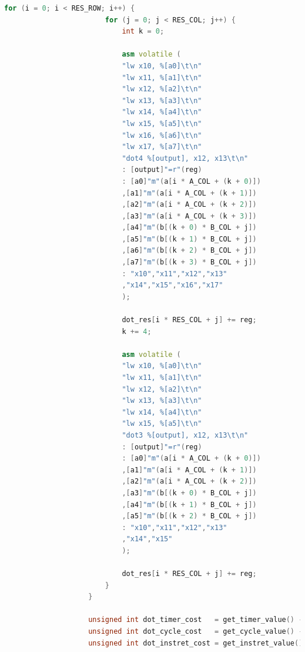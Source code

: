 \documentclass[a4paper, 14pt, oneside]{book} %
\numberwithin{equation}{subsection}
\begin{document}
\begin{enumerate}
\begin{itemize}
\begin{lstlisting}[language={C++}]
					for (i = 0; i < RES_ROW; i++) {
						for (j = 0; j < RES_COL; j++) {
							int k = 0;
							
							asm volatile (
							"lw x10, %[a0]\t\n"
							"lw x11, %[a1]\t\n"
							"lw x12, %[a2]\t\n"
							"lw x13, %[a3]\t\n"
							"lw x14, %[a4]\t\n"
							"lw x15, %[a5]\t\n"
							"lw x16, %[a6]\t\n"
							"lw x17, %[a7]\t\n"
							"dot4 %[output], x12, x13\t\n"
							: [output]"=r"(reg)
							: [a0]"m"(a[i * A_COL + (k + 0)])
							,[a1]"m"(a[i * A_COL + (k + 1)])
							,[a2]"m"(a[i * A_COL + (k + 2)])
							,[a3]"m"(a[i * A_COL + (k + 3)])
							,[a4]"m"(b[(k + 0) * B_COL + j])
							,[a5]"m"(b[(k + 1) * B_COL + j])
							,[a6]"m"(b[(k + 2) * B_COL + j])
							,[a7]"m"(b[(k + 3) * B_COL + j])
							: "x10","x11","x12","x13"
							,"x14","x15","x16","x17"
							);
							
							dot_res[i * RES_COL + j] += reg;
							k += 4;
							
							asm volatile (
							"lw x10, %[a0]\t\n"
							"lw x11, %[a1]\t\n"
							"lw x12, %[a2]\t\n"
							"lw x13, %[a3]\t\n"
							"lw x14, %[a4]\t\n"
							"lw x15, %[a5]\t\n"
							"dot3 %[output], x12, x13\t\n"
							: [output]"=r"(reg)
							: [a0]"m"(a[i * A_COL + (k + 0)])
							,[a1]"m"(a[i * A_COL + (k + 1)])
							,[a2]"m"(a[i * A_COL + (k + 2)])
							,[a3]"m"(b[(k + 0) * B_COL + j])
							,[a4]"m"(b[(k + 1) * B_COL + j])
							,[a5]"m"(b[(k + 2) * B_COL + j])
							: "x10","x11","x12","x13"
							,"x14","x15"
							);
							
							dot_res[i * RES_COL + j] += reg;			   
						}
					}
					
					unsigned int dot_timer_cost   = get_timer_value() - dot_timer_start;
					unsigned int dot_cycle_cost   = get_cycle_value() - dot_cycle_start;
					unsigned int dot_instret_cost = get_instret_value() - dot_instret_start;
					

\end{lstlisting}
\end{itemize}
\end{enumerate}
\end{document}
